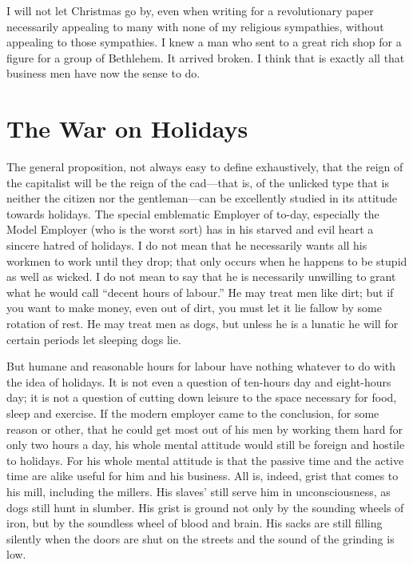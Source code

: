 \documentclass{book}
\begin{document}
I will not let Christmas go by, even when writing for a revolutionary paper necessarily appealing to many with none of my religious sympathies, without appealing to those sympathies. I knew a man who sent to a great rich shop for a figure for a group of Bethlehem. It arrived broken. I think that is exactly all that business men have now the sense to do.

\chapter{The War on Holidays}
\label{chapter-3}
The general proposition, not always easy to define exhaustively, that the reign of the capitalist will be the reign of the cad—that is, of the unlicked type that is neither the citizen nor the gentleman—can be excellently studied in its attitude towards holidays. The special emblematic Employer of to-day, especially the Model Employer (who is the worst sort) has in his starved and evil heart a sincere hatred of holidays. I do not mean that he necessarily wants all his workmen to work until they drop; that only occurs when he happens to be stupid as well as wicked. I do not mean to say that he is necessarily unwilling to grant what he would call “decent hours of labour.” He may treat men like dirt; but if you want to make money, even out of dirt, you must let it lie fallow by some rotation of rest. He may treat men as dogs, but unless he is a lunatic he will for certain periods let sleeping dogs lie.

But humane and reasonable hours for labour have nothing whatever to do with the idea of holidays. It is not even a question of ten-hours day and eight-hours day; it is not a question of cutting down leisure to the space necessary for food, sleep and exercise. If the modern employer came to the conclusion, for some reason or other, that he could get most out of his men by working them hard for only two hours a day, his whole mental attitude would still be foreign and hostile to holidays. For his whole mental attitude is that the passive time and the active time are alike useful for him and his business. All is, indeed, grist that comes to his mill, including the millers. His slaves’ still serve him in unconsciousness, as dogs still hunt in slumber. His grist is ground not only by the sounding wheels of iron, but by the soundless wheel of blood and brain. His sacks are still filling silently when the doors are shut on the streets and the sound of the grinding is low.
\end{document}
